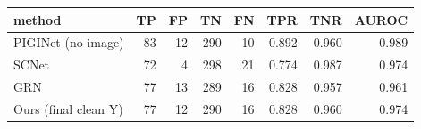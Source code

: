 \begin{tabular}{lrrrrrrr}
\toprule
method & TP & FP & TN & FN & TPR & TNR & AUROC \\
\midrule
PIGINet (no image) & 83 & 12 & 290 & 10 & 0.892 & 0.960 & 0.989 \\
SCNet & 72 & 4 & 298 & 21 & 0.774 & 0.987 & 0.974 \\
GRN & 77 & 13 & 289 & 16 & 0.828 & 0.957 & 0.961 \\
Ours (final clean Y) & 77 & 12 & 290 & 16 & 0.828 & 0.960 & 0.974 \\
\bottomrule
\end{tabular}
